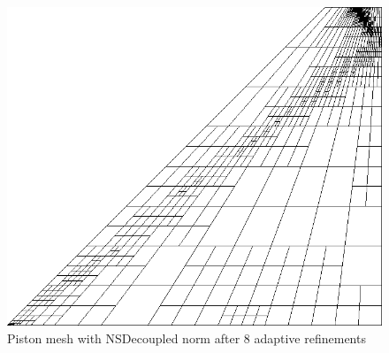 \documentclass[Dissertation.tex]{subfiles}
\begin{document}
\begin{figure}[ht]
\centering
\centering
\includegraphics[width=\textwidth]{Piston/Piston_mesh.png}
\caption{Piston mesh with NSDecoupled norm after 8 adaptive refinements}
\label{fig:PistonMesh}
\end{figure}

\end{document}
